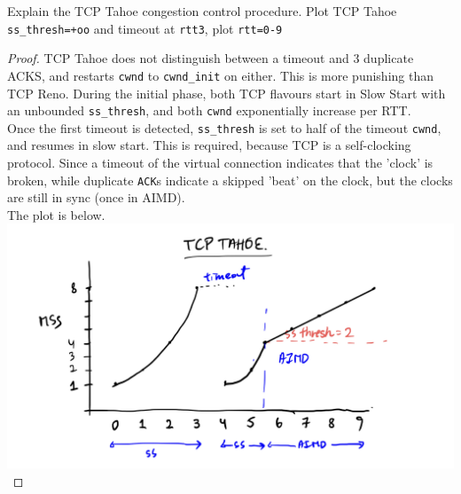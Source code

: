 \documentclass[./answersheet.tex]{subfiles}
\begin{document}
\begin{wts}
    Explain the TCP Tahoe congestion control procedure. Plot TCP Tahoe \verb|ss_thresh=+oo| and timeout at \verb|rtt3|, plot \verb|rtt=0-9|
\end{wts}
\begin{proof}
    TCP Tahoe does not distinguish between a timeout and 3 duplicate ACKS, and restarts  \verb|cwnd| to \verb|cwnd_init| on either. This is more punishing than TCP Reno. During the initial phase, both TCP flavours start in Slow Start with an unbounded \verb|ss_thresh|, and both \verb|cwnd| exponentially increase per RTT.\\
    
    Once the first timeout is detected, \verb|ss_thresh| is set to half of the timeout \verb|cwnd|, and resumes in slow start. This is required, because TCP is a self-clocking protocol. Since a timeout of the virtual connection indicates that the 'clock' is broken, while duplicate \verb|ACK|s indicate a skipped 'beat' on the clock, but the clocks are still in sync (once in AIMD).\\
    
    The plot is below.\\
    \includegraphics[width=\columnwidth]{./TCP_Q13.jpeg}
    

\end{proof}
\end{document}
